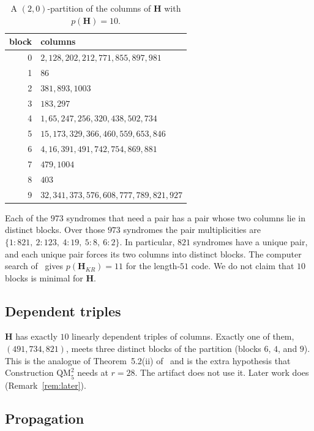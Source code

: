 \documentclass[11pt,a4paper]{article}
\newcommand{\HH}{\boldsymbol{H}}
\theoremstyle{remark}
\begin{document}
\begin{table}[ht]
\centering
\renewcommand{\arraystretch}{1.15}
\begin{tabular}{@{}rl@{}}
\toprule
block & columns \\
\midrule
0 & $2,128,202,212,771,855,897,981$ \\
1 & $86$ \\
2 & $381,893,1003$ \\
3 & $183,297$ \\
4 & $1,65,247,256,320,438,502,734$ \\
5 & $15,173,329,366,460,559,653,846$ \\
6 & $4,16,391,491,742,754,869,881$ \\
7 & $479,1004$ \\
8 & $403$ \\
9 & $32,341,373,576,608,777,789,821,927$ \\
\bottomrule
\end{tabular}
\caption{A $(2,0)$-partition of the columns of $\HH$ with $p(\HH)=10$.}
\label{tab:part}
\end{table}

Each of the $973$ syndromes that need a pair has a pair whose two
columns lie in distinct blocks. Over those $973$ syndromes the pair
multiplicities are $\{1{:}821,\ 2{:}123,\ 4{:}19,\ 5{:}8,\ 6{:}2\}$. In
particular, $821$ syndromes have a unique pair, and each unique pair
forces its two columns into distinct blocks. The computer search
of~\cite{DMP2025} gives $p(\HH_{KR})=11$ for the length-$51$ code. We
do not claim that $10$ blocks is minimal for $\HH$.

\subsection{Dependent triples}

$\HH$ has exactly $10$ linearly dependent triples of columns. Exactly
one of them, $(491,734,821)$, meets three distinct blocks of the
partition (blocks $6$, $4$, and $9$). This is the analogue of
Theorem~5.2(ii) of~\cite{DMP2025} and is the extra hypothesis that
Construction $\mathrm{QM}_5^2$ needs at $r=28$. The artifact
 does not use it. Later work does
(Remark~\ref{rem:later}).

\subsection{Propagation}
\label{sec:prop}
\end{document}
